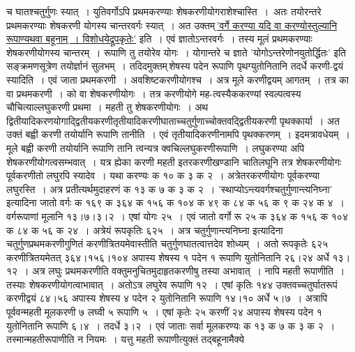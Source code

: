 \documentclass[11pt, openany]{book}
\begin{document}
\begin{sloppypar}
\noindent च घातश्चतुर्गुणः स्यात्~। युतिवर्गोऽपि प्रथमकरण्याः शेषकरणीयोगराशेश्चास्ति~।~अतः तयोरन्तरे प्रथमकरण्याः शेषकरणी योगस्य चान्तरवर्गः स्यात्~। अत उक्तम्\textendash \,\hyperref[4.41]{'वर्गे करण्या यदि वा करण्योस्तुल्यानि रूपाण्यथवा बहूनाम्~। विशोधयेद्रूपकृतेः'} इति~। एवं ज्ञातोऽन्तरवर्गः~। तस्य मूलं प्रथमकरण्याः शेषकरणीयोगस्य चान्तरम्~। रूपाणि तु तयोरेव योगः~। योगान्तरे च ज्ञाते {\color{violet}'योगोऽन्तरेणोनयुतोर्द्धितः'} इति सङ्क्रमणसूत्रेण तयोर्ज्ञानं सुलभम्~। तदिदमुक्तम्\textendash \,शेषस्य पदेन रूपाणि पृथग्युतोनितानि तदर्धे करणी-द्वयं स्यादिति~। एवं जाता प्रथमकरणी~। अवशिष्टकरणीयोगश्च~। अत्र मूले करणीद्वयम् आगतम्~। तत्र का वा प्रथमकरणी~। को वा शेषकरणीयोगः~। तत्र करणीयोगे मह-त्वस्यैककरण्यां स्वल्पत्वस्य चौचित्याल्लघुकरणी प्रथमा~। महती तु शेषकरणीयोगः~। अथ द्वितीयादिकरणयोगाद्द्वितीयकरणीतृतीयादिकरणीघाताच्चतुर्गुणाच्चोक्तवद्द्वितीयकरणी पृथक्कार्या~। अत उक्तं बह्वी करणी तयोर्यानि रूपाणि तानीति~। एवं तृतीयादिकरणीनामपि पृथक्करणम्~। इदमत्रावधेयम्~। मूले बह्वी करणी तयोर्यानि रूपाणि तानि त्वन्यत्र क्वचिल्लघुकरणीरूपाणि~। लघुकरण्या अपि शेषकरणीयोगत्वसम्भवात्~। यत्र ह्येका करणी महती इतरकरणीखण्डानि चातिलघूनि तत्र शेषकरणीयोगः पूर्वकरणीतो लघुरपि  स्यादेव~। यथा करण्यः क १० क ३ क २~। अत्रेतरकरणीयोगः पूर्वकरण्या लघुरस्ति~। अत्र प्रतीत्यर्थमुदाहरणं क १३ क ७ क ३ क २~। {\color{violet}'स्थाप्योऽन्त्यवर्गश्चतुर्गुणान्त्यनिघ्ना'} इत्यादिना जातो वर्गः क १६९ क ३६४ क १५६ क १०४ क ४९ क ८४ क ५६ क ९ क २४ क ४~। वर्गरूपाणां मूलानि १३।७।३।२~। एषां योगः २५~। एवं जातो वर्गो रू २५ क ३६४ क १५६ क १०४ क ८४ क ५६ क २४~। अत्रेयं रूपकृतिः ६२५~। अत्र {\color{violet}चतुर्गुणान्त्यनिघ्ना} इत्यादिना चतुर्गुणप्रथमकरणीगुणितं करणीत्रितयमेवास्तीति चतुर्गुणघातत्वात्तदेव शोध्यम्~। अतो रूपकृतेः ६२५ करणीत्रितयमेतत् ३६४।१५६।१०४ अपास्य शेषस्य १ पदेन १ रूपाणि युतोनितानि २६।२४ अर्धे १३।१२~। अत्र लघुः प्रथमकरणीति वक्तुमनुचितमुदाहृतकरणीषु तस्या अभावात्~। नापि महती रूपाणीति~। तस्याः शेषकरणीयोगत्वाभावात्~। अतोऽत्र लघुरेव रूपाणि १२~। एषां कृतिः १४४ उक्तवच्चतुर्घातरूपं करणीद्वयं ८४।५६ अपास्य शेषस्य ४ पदेन २ युतोनितानि रूपाणि १४।१० अर्धे ५।७~। अत्रापि पूर्ववन्महती मूलकरणी ७ लघ्वी ५ रूपाणि ५~। एषां कृतेः २५ करणीं २४ अपास्य शेषस्य पदेन १ युतोनितानि रूपाणि ६।४~। तदर्धे ३।२~। एवं जाताः सर्वा मूलकरण्यः क १३ क ७ क ३ क २~। तस्मान्महतीरूपाणीति न नियमः~। यत्तु महती रूपाणीत्युक्तं तद्बहूनामैक्ये
\end{sloppypar}

\newpage
\end{document}
